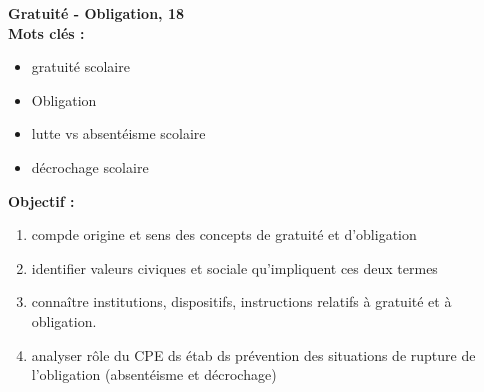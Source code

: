\documentclass[12pt]{article}
\begin{document}
\textbf{Gratuité - Obligation, 18} \\

\textbf{Mots clés : }
\begin{itemize}
\item gratuité scolaire
\item Obligation
\item lutte vs absentéisme scolaire
\item décrochage scolaire
\end{itemize}

\vspace{0.5cm}

\textbf{Objectif :}


\begin{enumerate}
\item compde origine et sens des concepts de gratuité et d'obligation
\item identifier valeurs civiques et sociale qu'impliquent ces deux termes
\item connaître institutions, dispositifs, instructions relatifs à gratuité et à obligation.
\item analyser rôle du CPE ds étab ds prévention des situations de rupture de l'obligation (absentéisme et décrochage)\\
\end{enumerate}
\end{document}
